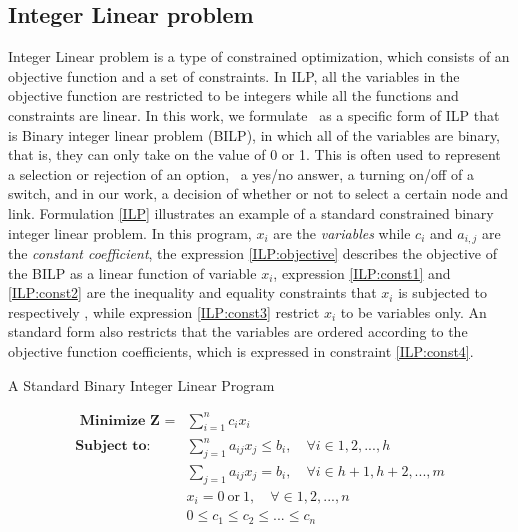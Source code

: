 \subsection{Integer Linear problem}
Integer Linear problem is a type of constrained optimization, which consists of an objective function and a set of constraints. In ILP, all the variables in the objective function are restricted to be integers while all the functions and constraints are linear. In this work, we formulate \myproblem\ as a specific form of ILP that is Binary integer linear problem (BILP), in which all of the variables are binary, that is, they can only take on the value of 0 or 1. This  is often used to represent a selection or rejection of an option, \eg\ a yes/no answer, a turning on/off of a switch, and in our work, a decision of whether or not to select a certain node and link.
Formulation \ref{ILP} illustrates an example of a standard constrained binary integer linear problem. In this program, $x_i$ are the \textit{variables} while $c_i$ and $a_{i,j}$ are the \textit{constant coefficient},  the expression \ref{ILP:objective} describes the objective of the BILP as a linear function of variable $x_i$, expression \ref{ILP:const1} and \ref{ILP:const2} are the inequality and equality constraints that $x_i$ is subjected to respectively , while expression \ref{ILP:const3} restrict $x_i$ to be variables only. An standard form also restricts that the variables are ordered according to the objective function coefficients, which is expressed in constraint \ref{ILP:const4}.
\begin{problemenv}
	\caption{A Standard Binary Integer Linear Program}
	\begin{subequations}
		\label{ILP}
		\begin{align}
			\label{ILP:objective}
			\textbf{ Minimize Z =}  & \sum_{i=1}^nc_ix_i\\
			\label{ILP:const1}
			\textbf{Subject to:}  &\sum_{j=1}^n a_{ij}x_j \leq b_i, \quad\forall i \in {1, 2,    ..., h}\\
			\label{ILP:const2}
			&\sum_{j=1}a_{ij}x_j = b_i, \quad\forall i \in {h+1, h+2, ..., m} \\
			\label{ILP:const3}
			& x_i =  0\ \text{or}\ 1,\quad \forall \in {1, 2, ..., n}\\
			\label{ILP:const4}
			& 0\leq c_1\leq c_2 \leq ...\leq c_n 
		\end{align}
	\end{subequations}
\end{problemenv}

